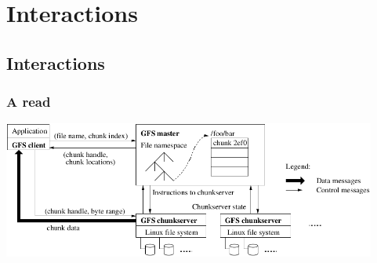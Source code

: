 \documentclass{beamer}
\newcommand{\slidewidth}{12.3cm}
\begin{document}
\section{Interactions}
\subsection{Interactions}
\begin{frame}
 \frametitle{A read}
 \centering
 \includegraphics[width=\slidewidth]{figures/GFSarchitecture.png}
\end{frame}
\end{document}
